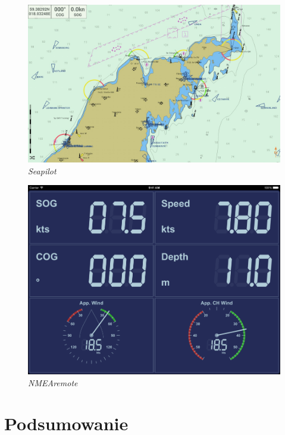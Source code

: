 \documentclass[skorowidz,skroty]{dyplomWEZUT}
\begin{document}
\begin{figure}[H]
  \centering
    \includegraphics[scale=0.3]{graphic/Seapilot}
    \caption{\textit{Seapilot}}
    \label{fig:Seapilot}
\end{figure}

\begin{figure}[H]
  \centering
    \includegraphics[scale=0.3]{graphic/NMEAremote}
    \caption\textit{{NMEAremote}}
    \label{fig:NMEAremote}
\end{figure}

\section{Podsumowanie}\label{chap: summary}
\end{document}
